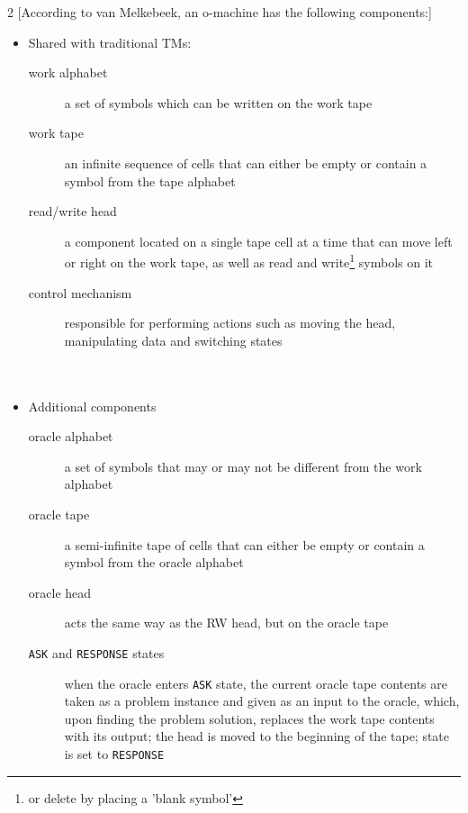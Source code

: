 \documentclass[12pt,a4,xcolor=table]{article}
\begin{document}
\begin{multicols}{2}
	[According to van Melkebeek\cite{Melkebeek}, an o-machine has the following components:]
	\begin{itemize}
		\item Shared with traditional TMs:
		\begin{description}
			\item[work alphabet] a set of symbols which can be written on the work tape
			\item[work tape] an infinite sequence of cells that can either be empty or contain a symbol from the tape alphabet
			\item[read/write head] a component located on a single tape cell at a time that can move left or right on the work tape, as well as read and write\footnote{or delete by placing a 'blank symbol'} symbols on it
			\item[control mechanism] responsible for performing actions such as moving the head, manipulating data and switching states\\\\\\
		\end{description}\columnbreak
		\item Additional components
		\begin{description}
			\item[oracle alphabet] a set of symbols that may or may not be different from the work alphabet
			\item[oracle tape] a semi-infinite tape of cells that can either be empty or contain a symbol from the oracle alphabet
			\item[oracle head] acts the same way as the RW head, but on the oracle tape
			\item[\texttt{ASK} and \texttt{RESPONSE} states] when the oracle enters \texttt{ASK} state, the current oracle tape contents are taken as a problem instance and given as an input to the oracle, which, upon finding the problem solution, replaces the work tape contents with its output; the head is moved to the beginning of the tape; state is set to \texttt{RESPONSE}
		\end{description}
	\end{itemize}
\end{multicols}





\end{document}
